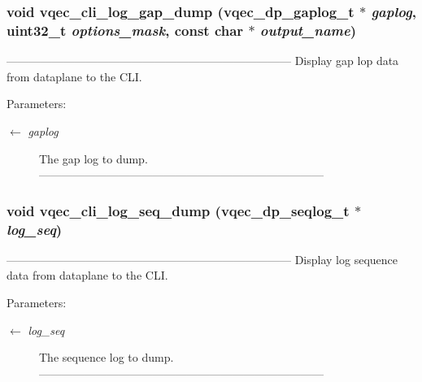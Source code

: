 \subsubsection{\setlength{\rightskip}{0pt plus 5cm}void vqec\_\-cli\_\-log\_\-gap\_\-dump (vqec\_\-dp\_\-gaplog\_\-t $\ast$ {\em gaplog}, uint32\_\-t {\em options\_\-mask}, const char $\ast$ {\em output\_\-name})}\label{vqec__cli__interface_8c_5fbac07086a654a724f5dbdbca171a8f}


--------------------------------------------------------------------------- Display gap lop data from dataplane to the CLI.

\begin{Desc}
\item[Parameters:]
\begin{description}
\item[\mbox{$\leftarrow$} {\em gaplog}]The gap log to dump. --------------------------------------------------------------------------- \end{description}
\end{Desc}
\subsubsection{\setlength{\rightskip}{0pt plus 5cm}void vqec\_\-cli\_\-log\_\-seq\_\-dump (vqec\_\-dp\_\-seqlog\_\-t $\ast$ {\em log\_\-seq})}\label{vqec__cli__interface_8c_27e4d3047112f08fbd51658f2b53cd55}


--------------------------------------------------------------------------- Display log sequence data from dataplane to the CLI.

\begin{Desc}
\item[Parameters:]
\begin{description}
\item[\mbox{$\leftarrow$} {\em log\_\-seq}]The sequence log to dump. --------------------------------------------------------------------------- \end{description}
\end{Desc}
